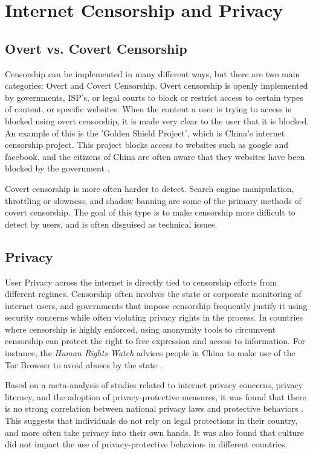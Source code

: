 \section{Internet Censorship and Privacy}

\subsection{Overt vs. Covert Censorship}

Censorship can be implemented in many different ways, but there are two main categories: Overt and Covert Censorship. Overt censorship is openly implemented by governments, ISP's, or legal courts to block or restrict access to certain types of content, or specific websites. When the content a user is trying to access is blocked using overt censorship, it is made very clear to the user that it is blocked. An example of this is the 'Golden Shield Project', which is China's internet censorship project. This project blocks access to websites such as google and facebook, and the citizens of China are often aware that they websites have been blocked by the government \cite{standfordGreatFirewallOfChina}.

Covert censorship is more often harder to detect. Search engine manipulation, throttling or slowness, and shadow banning are some of the primary methods of covert censorship. The goal of this type is to make censorship more difficult to detect by users, and is often disguised as technical issues. 

\subsection{Privacy}

User Privacy across the internet is directly tied to censorship efforts from different regimes. Censorship often involves the state or corporate monitoring of internet users, and governments that impose censorship frequently justify it using security concerns while often violating privacy rights in the process. In countries where censorship is highly enforced, using anonymity tools to circumvent censorship can protect the right to free expression and access to information. For instance, the \textit{Human Rights Watch} advises people in China to make use of the Tor Browser to avoid abuses by the state \cite{Privacy2017}. 

Based on a meta-analysis of studies related to internet privacy concerns, privacy literacy, and the adoption of privacy-protective measures, it was found that there is no strong correlation between national privacy laws and protective behaviors \cite{baruh2017online}. This suggests that individuals do not rely on legal protections in their country, and more often take privacy into their own hands. It was also found that culture did not impact the use of privacy-protective behaviors in different countries. 

